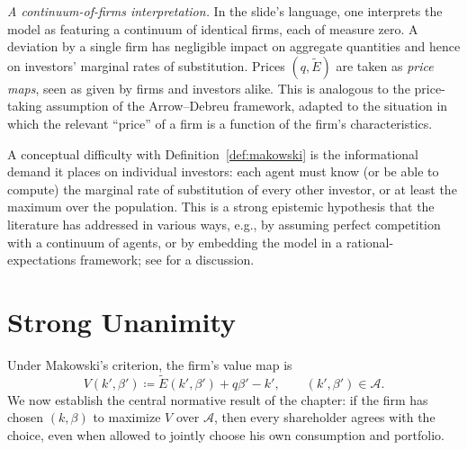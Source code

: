 \documentclass[11pt,a4paper,oneside]{book}
\theoremstyle{plain}
\theoremstyle{definition}
\theoremstyle{remark}
\numberwithin{equation}{chapter}
\begin{document}
\emph{A continuum-of-firms interpretation.}
In the slide's language, one interprets the model as featuring a continuum of identical firms, each of measure zero.
A deviation by a single firm has negligible impact on aggregate quantities and hence on investors' marginal rates of substitution.
Prices $(q, \widetilde{E})$ are taken as \emph{price maps}, seen as given by firms and investors alike.
This is analogous to the price-taking assumption of the Arrow--Debreu framework, adapted to the situation in which the relevant ``price'' of a firm is a function of the firm's characteristics.

A conceptual difficulty with Definition~\ref{def:makowski} is the informational demand it places on individual investors: each agent must know (or be able to compute) the marginal rate of substitution of every other investor, or at least the maximum over the population.
This is a strong epistemic hypothesis that the literature has addressed in various ways, e.g., by assuming perfect competition with a continuum of agents, or by embedding the model in a rational-expectations framework; see \citet{BisinGottardiRuta2014} for a discussion.

\section{Strong Unanimity}
\label{sec:strong-unanimity}

Under Makowski's criterion, the firm's value map is
\begin{equation}\label{eq:firm-value-BGR}
  V(k', \beta') \coloneqq \widetilde{E}(k', \beta') + q \beta' - k',
  \qquad (k', \beta') \in \mathcal{A}.
\end{equation}
We now establish the central normative result of the chapter: if the firm has chosen $(k, \beta)$ to maximize $V$ over $\mathcal{A}$, then every shareholder agrees with the choice, even when allowed to jointly choose his own consumption and portfolio.
\end{document}
